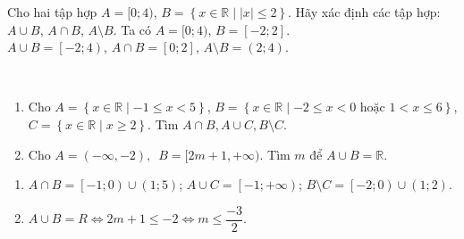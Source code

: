 \begin{bt}%
	Cho hai tập hợp $A=[0;4)$, $B=\left\{x\in \mathbb{R}\mid |x|\le 2\right\}$. Hãy xác định các tập hợp: 
	$ A\cup B$, $A\cap B$, $A\setminus B$.
	\loigiai
	{
		Ta có $A=[0;4)$, $B=[-2;2]$.\\
		$ A\cup B=\left[-2;4\right)$, $ A\cap B=\left[0;2\right]$, $ A\setminus B=\left(2;4\right)$.
	}
\end{bt}

\begin{bt}%
	~
	\begin{enumerate}
		\item Cho $A=\left\{x\in\mathbb{R}\mid -1\le x < 5\right\}$, $B=\left\{x\in\mathbb{R}\mid -2\le x < 0 \text{ hoặc } 1<x\le 6\right\}$, $C=\left\{x\in\mathbb{R}\mid x\ge 2\right\}$.
		Tìm $A\cap B,A\cup C,B\setminus C$.
		\item Cho $ A=\left(-\infty ,-2\right),\,\,\,B=[2m+1,+\infty)$. Tìm $m$ để $ A\cup B=\mathbb{R}$.
	\end{enumerate}
	\loigiai
	{
		\begin{enumerate}
			\item $A\cap B=\left[-1;0\right)\cup\left(1;5\right)$; $A\cup C=\left[-1;+\infty\right)$; $B\setminus C=\left[-2;0\right)\cup\left(1;2\right)$.
			\item $ A\cup B=R\Leftrightarrow 2m+1 \le-2\Leftrightarrow m \le\dfrac{-3}{2}$.
		\end{enumerate}
	}
\end{bt}

